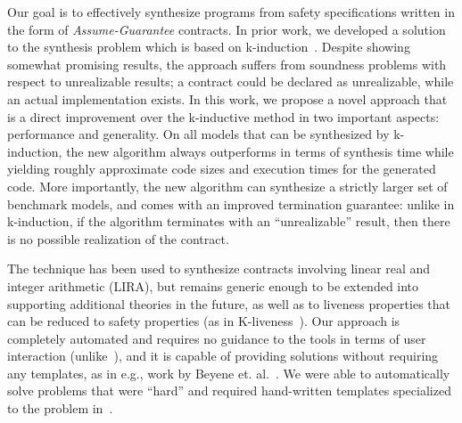 Our goal is to effectively synthesize programs from safety specifications written in the form of {\em
Assume-Guarantee} contracts. In prior work, we developed a solution to the synthesis problem which is based on k-induction~\cite{gacek2015towards,katis2016towards,KatisFGBGW16}.
Despite showing somewhat promising results, the approach suffers from soundness problems with respect to unrealizable results; a contract could be declared as unrealizable, while an actual implementation exists.
In this work, we propose a novel approach that is a direct improvement over the k-inductive method in two important aspects: performance and generality.  On all models that can be synthesized
by k-induction, the new algorithm always outperforms in terms of synthesis time while yielding roughly approximate code sizes and execution times for the generated code. More importantly, the new algorithm can synthesize a strictly larger set of benchmark models,
and comes with an improved termination guarantee: unlike in k-induction, if the algorithm terminates with an ``unrealizable'' result, then there is no possible realization of the contract.

The technique has been used to synthesize contracts involving linear real and integer arithmetic (LIRA),
but remains generic enough to be extended into supporting additional theories
in the future, as well as to liveness properties that can be reduced to safety properties (as in K-liveness~\cite{claessen2012liveness}).  Our approach is completely automated and requires no guidance to the tools in terms of user interaction (unlike~\cite{ryzhyk2014user,ryzhyk2016developing}), and it is capable of providing solutions without requiring any templates, as in e.g., work by Beyene et. al.~\cite{beyene2014constraint}.  We were able to automatically solve problems that were ``hard'' and required hand-written templates specialized to the problem in~\cite{beyene2014constraint}.


